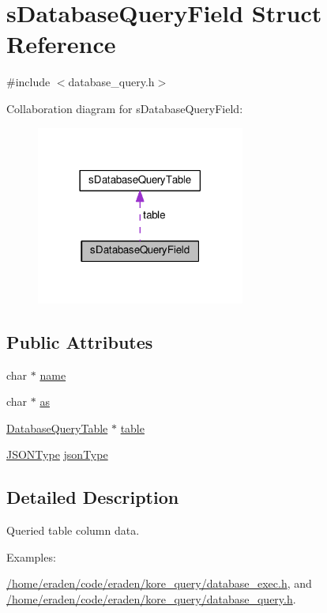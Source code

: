 \hypertarget{structsDatabaseQueryField}{}\section{s\+Database\+Query\+Field Struct Reference}
\label{structsDatabaseQueryField}


{\ttfamily \#include $<$database\+\_\+query.\+h$>$}



Collaboration diagram for s\+Database\+Query\+Field\+:\nopagebreak
\begin{figure}[H]
\begin{center}
\leavevmode
\includegraphics[width=194pt]{structsDatabaseQueryField__coll__graph}
\end{center}
\end{figure}
\subsection*{Public Attributes}
\begin{DoxyCompactItemize}
\item 
char $\ast$ \hyperlink{structsDatabaseQueryField_a89dd83131d90a8d8aeabfcafdde956b0}{name}
\item 
char $\ast$ \hyperlink{structsDatabaseQueryField_a97d3648cdd9355173c5e1f2322050473}{as}
\item 
\hyperlink{database__query_8h_a38971f81715db3c243144b5e840c2457}{Database\+Query\+Table} $\ast$ \hyperlink{structsDatabaseQueryField_a32161fc1b757bde0390ae5f3ef50c7c4}{table}
\item 
\hyperlink{json_8h_af761d54284482a1af5a01d8f52845b49}{J\+S\+O\+N\+Type} \hyperlink{structsDatabaseQueryField_a6e0fe90cd89abdc82116cc61be5119d5}{json\+Type}
\end{DoxyCompactItemize}


\subsection{Detailed Description}
Queried table column data. \begin{Desc}
\item[Examples\+: ]\par
\hyperlink{_2home_2eraden_2code_2eraden_2kore_query_2database_exec_8h-example}{/home/eraden/code/eraden/kore\+\_\+query/database\+\_\+exec.\+h}, and \hyperlink{_2home_2eraden_2code_2eraden_2kore_query_2database_query_8h-example}{/home/eraden/code/eraden/kore\+\_\+query/database\+\_\+query.\+h}.\end{Desc}



